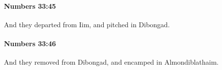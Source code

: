 		\paragraph{Numbers 33:45} %
			\label{NUMBERS-33-45}

			And they departed from Iim, and pitched in Dibongad.


		\paragraph{Numbers 33:46} %
			\label{NUMBERS-33-46}

			And they removed from Dibongad, and encamped in Almondiblathaim.


